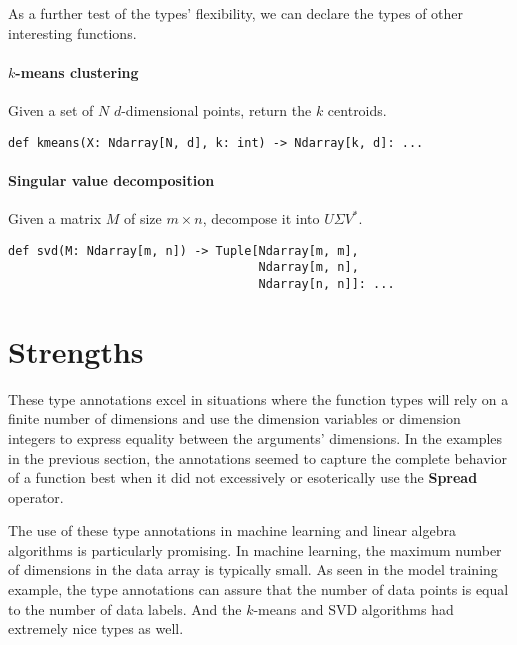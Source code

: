 \documentclass{report}
\begin{document}
As a further test of the types' flexibility, we can declare the types of other interesting functions.

\paragraph{$k$-means clustering}
Given a set of $N$ $d$-dimensional points, return the $k$ centroids.

\begin{singlespace*}
    \begin{verbatim}
def kmeans(X: Ndarray[N, d], k: int) -> Ndarray[k, d]: ... \end{verbatim}
\end{singlespace*}

\paragraph{Singular value decomposition}
Given a matrix $M$ of size $m \times n$, decompose it into $U\Sigma V^*$.
\begin{singlespace*}
    \begin{verbatim}
def svd(M: Ndarray[m, n]) -> Tuple[Ndarray[m, m],
                                   Ndarray[m, n],
                                   Ndarray[n, n]]: ...\end{verbatim}
\end{singlespace*}

\section{Strengths}

These type annotations excel in situations where the function types will rely on a finite number of dimensions and use the dimension variables or dimension integers to express equality between the arguments' dimensions. In the examples in the previous section, the annotations seemed to capture the complete behavior of a function best when it did not excessively or esoterically use the \textbf{Spread} operator.

The use of these type annotations in machine learning and linear algebra algorithms is particularly promising. In machine learning, the maximum number of dimensions in the data array is typically small. As seen in the model training example, the type annotations can assure that the number of data points is equal to the number of data labels. And the $k$-means and SVD algorithms had extremely nice types as well.
\end{document}
